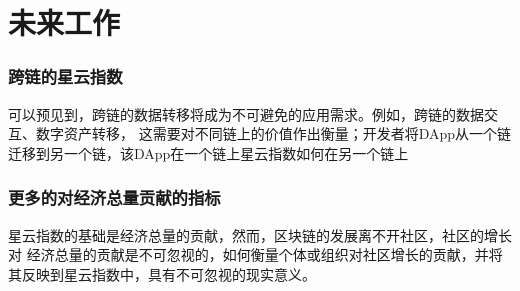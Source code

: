 \section{未来工作}
\begin{frame}\frametitle{跨链的星云指数}
可以预见到，跨链的数据转移将成为不可避免的应用需求。例如，跨链的数据交互、数字资产转移，
这需要对不同链上的价值作出衡量；开发者将DApp从一个链迁移到另一个链，该DApp在一个链上星云指数如何在另一个链上
\end{frame}

\begin{frame}\frametitle{更多的对经济总量贡献的指标}
星云指数的基础是经济总量的贡献，然而，区块链的发展离不开社区，社区的增长对
经济总量的贡献是不可忽视的，如何衡量个体或组织对社区增长的贡献，并将其反映到星云指数中，具有不可忽视的现实意义。
\end{frame}